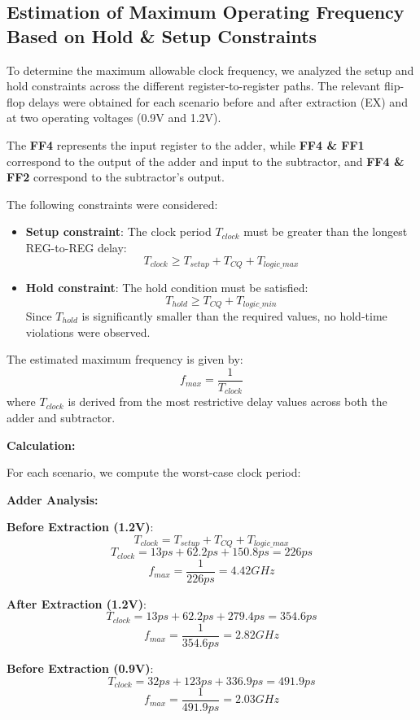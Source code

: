 \documentclass[a4paper,12pt]{article}
\begin{document}
\subsection{Estimation of Maximum Operating Frequency Based on Hold \& Setup Constraints}

To determine the maximum allowable clock frequency, we analyzed the setup and hold constraints across the different register-to-register paths. The relevant flip-flop delays were obtained for each scenario before and after extraction (EX) and at two operating voltages (0.9V and 1.2V).

The \textbf{FF4} represents the input register to the adder, while \textbf{FF4 \& FF1} correspond to the output of the adder and input to the subtractor, and \textbf{FF4 \& FF2} correspond to the subtractor’s output.

The following constraints were considered:
\begin{itemize}
    \item \textbf{Setup constraint}: The clock period \(T_{clock}\) must be greater than the longest REG-to-REG delay:
    \[
    T_{clock} \geq T_{setup} + T_{CQ} + T_{logic\_max}
    \]
    \item \textbf{Hold constraint}: The hold condition must be satisfied:
    \[
    T_{hold} \geq T_{CQ} + T_{logic\_min}
    \]
    Since \(T_{hold}\) is significantly smaller than the required values, no hold-time violations were observed.
\end{itemize}

The estimated maximum frequency is given by:
\[
f_{max} = \frac{1}{T_{clock}}
\]
where \( T_{clock} \) is derived from the most restrictive delay values across both the adder and subtractor.

\textbf{Calculation:}

For each scenario, we compute the worst-case clock period:

\textbf{Adder Analysis:}

\textbf{Before Extraction (1.2V)}:
\[
T_{clock} = T_{setup} + T_{CQ} + T_{logic\_max}
\]
\[
T_{clock} = 13ps + 62.2ps + 150.8ps = 226ps
\]
\[
f_{max} = \frac{1}{226ps} = 4.42GHz
\]

\textbf{After Extraction (1.2V)}:
\[
T_{clock} = 13ps + 62.2ps + 279.4ps = 354.6ps
\]
\[
f_{max} = \frac{1}{354.6ps} = 2.82GHz
\]

\textbf{Before Extraction (0.9V)}:
\[
T_{clock} = 32ps + 123ps + 336.9ps = 491.9ps
\]
\[
f_{max} = \frac{1}{491.9ps} = 2.03GHz
\]
\end{document}
